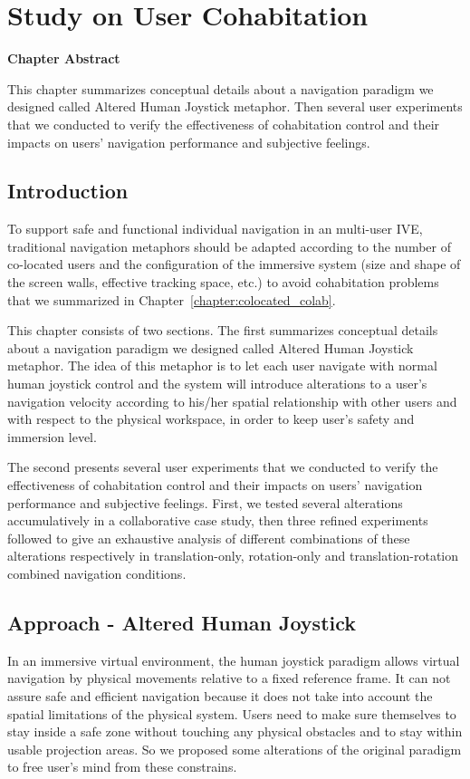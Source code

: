 \chapter{Study on User Cohabitation}
\label{chapter:user_cohab}
\pagebreak

\textbf{Chapter Abstract}

This chapter summarizes conceptual details about a navigation paradigm we designed called Altered Human Joystick metaphor. Then several user experiments that we conducted to verify the effectiveness of cohabitation control and their impacts on users' navigation performance and subjective feelings.

\vspace*{2\baselineskip}

\minitoc

\newpage
\section{Introduction}
To support safe and functional individual navigation in an multi-user IVE, traditional navigation metaphors should be adapted according to the number of co-located users and the configuration of the immersive system (size and shape of the screen walls, effective tracking space, etc.) to avoid cohabitation problems that we summarized in Chapter~\ref{chapter:colocated_colab}.

This chapter consists of two sections. The first summarizes conceptual details about a navigation paradigm we designed called Altered Human Joystick metaphor. The idea of this metaphor is to let each user navigate with normal human joystick control and the system will introduce alterations to a user's navigation velocity according to his/her spatial relationship with other users and with respect to the physical workspace, in order to keep user's safety and immersion level.

The second presents several user experiments that we conducted to verify the effectiveness of cohabitation control and their impacts on users' navigation performance and subjective feelings. First, we tested several alterations accumulatively in a collaborative case study, then three refined experiments followed to give an exhaustive analysis of different combinations of these alterations respectively in translation-only, rotation-only and translation-rotation combined navigation conditions.


\section{Approach - Altered Human Joystick}
In an immersive virtual environment, the human joystick paradigm allows virtual navigation by physical movements relative to a fixed reference frame. It can not assure safe and efficient navigation because it does not take into account the spatial limitations of the physical system. Users need to make sure themselves to stay inside a safe zone without touching any physical obstacles and to stay within usable projection areas. So we proposed some alterations of the original paradigm to free user's mind from these constrains.

